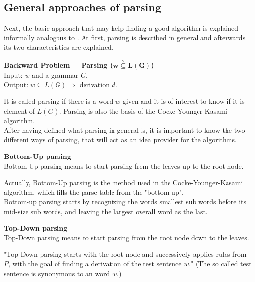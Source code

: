 \subsection{General approaches of parsing} \label{approaches}
Next, the basic approach that may help finding a good algorithm is explained informally analogous to \cite{Duda.2012}. At first, parsing is described in general and afterwards its two characteristics are explained.  
\begin{DefGrey}
	\textbf{Backward Problem = Parsing ($\mathbf{w\overset{?}{\subseteq}L(G)}$)}\\
	Input: $w$ and a grammar $G$. \\
	Output: $w \subseteq L(G) \Longrightarrow$ derivation $d$.
\end{DefGrey}
\noindent It is called parsing if there is a word $w$ given and it is of interest to know if it is element of $L(G)$. Parsing is also the basis of the Cocke-Younger-Kasami algorithm.\\
After having defined what parsing in general is, it is important to know the two different ways of parsing, that will act as an idea provider for the algorithms.
\begin{mdframed}[backgroundcolor=defColour]
	\textbf{Bottom-Up parsing} \\
Bottom-Up parsing means to start parsing from the leaves up to the root node.
\end{mdframed}
\noindent Actually, Bottom-Up parsing is the method used in the Cocke-Younger-Kasami algorithm, which fills the parse table from the "bottom up"\cite{Duda.2012}.\\
Bottom-up parsing starts by recognizing the words smallest sub words before its mid-size sub words, and leaving the largest overall word as the last.
\begin{mdframed}[backgroundcolor=defColour]
	\textbf{Top-Down parsing} \\
	 Top-Down parsing means to start parsing from the root node down to the leaves.
\end{mdframed}
\noindent "Top-Down parsing starts with the root node and successively applies rules from $P$, with the goal of finding a derivation of the test sentence $w$." \cite{Duda.2012} (The so called test sentence is synonymous to an word $w$.)
\pagebreak

